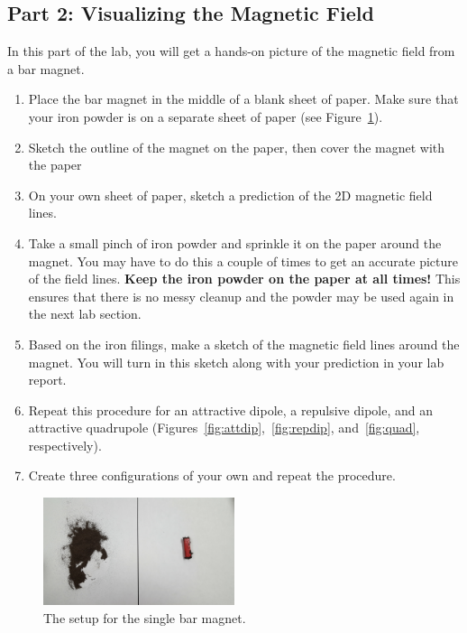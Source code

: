 \documentclass[12pt]{article}
\begin{document}
\subsection*{Part 2: Visualizing the Magnetic Field}
In this part of the lab, you will get a hands-on picture of the magnetic field from a bar magnet.
\begin{enumerate}
	\item{Place the bar magnet in the middle of a blank sheet of paper. Make sure that your iron powder is on a separate sheet of paper (see Figure~\ref{fig:setup}).}
	\item{Sketch the outline of the magnet on the paper, then cover the magnet with the paper}
	\item{On your own sheet of paper, sketch a prediction of the 2D magnetic field lines.}
	\item{Take a small pinch of iron powder and sprinkle it on the paper around the magnet. You may have to do this a couple of times to get an accurate picture of the field lines. \textbf{Keep the iron powder on the paper at all times!} This ensures that there is no messy cleanup and the powder may be used again in the next lab section.} 
	\item{Based on the iron filings, make a sketch of the magnetic field lines around the magnet. You will turn in this sketch along with your prediction in your lab report.}
	\item{Repeat this procedure for an attractive dipole, a repulsive dipole, and an attractive quadrupole (Figures~\ref{fig:attdip},~\ref{fig:repdip}, and~\ref{fig:quad}, respectively).}
	\item{Create three configurations of your own and repeat the procedure.}
	
\end{enumerate}

\begin{figure}[H]
	\begin{center}
	\includegraphics[width=0.5\textwidth]{setup}
	\caption{The setup for the single bar magnet.}
	\label{fig:setup}
	\end{center}
\end{figure}
\end{document}
